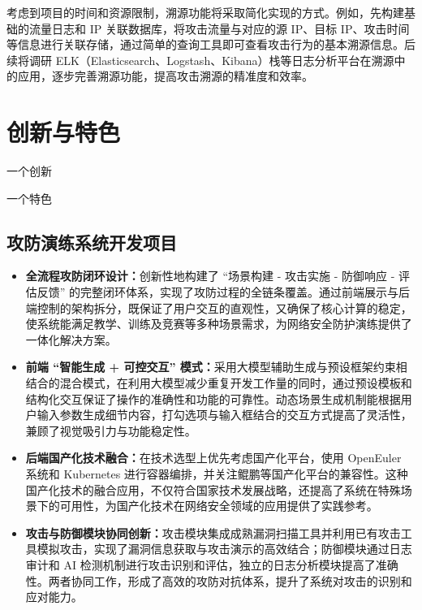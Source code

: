 \documentclass[lang=cn,10pt]{elegantbook}
\begin{document}
考虑到项目的时间和资源限制，溯源功能将采取简化实现的方式。例如，先构建基础的流量日志和 IP 关联数据库，将攻击流量与对应的源 IP、目标 IP、攻击时间等信息进行关联存储，通过简单的查询工具即可查看攻击行为的基本溯源信息。后续将调研 ELK（Elasticsearch、Logstash、Kibana）栈等日志分析平台在溯源中的应用，逐步完善溯源功能，提高攻击溯源的精准度和效率。

\chapter{创新与特色}
\begin{introduction}
  \item 一个创新
  \item 一个特色
\end{introduction}

\section{攻防演练系统开发项目}
\begin{itemize}
    \item \textbf{全流程攻防闭环设计：}创新性地构建了 “场景构建 - 攻击实施 - 防御响应 - 评估反馈” 的完整闭环体系，实现了攻防过程的全链条覆盖。通过前端展示与后端控制的架构拆分，既保证了用户交互的直观性，又确保了核心计算的稳定，使系统能满足教学、训练及竞赛等多种场景需求，为网络安全防护演练提供了一体化解决方案。
    \item \textbf{前端 “智能生成 + 可控交互” 模式：}采用大模型辅助生成与预设框架约束相结合的混合模式，在利用大模型减少重复开发工作量的同时，通过预设模板和结构化交互保证了操作的准确性和功能的可靠性。动态场景生成机制能根据用户输入参数生成细节内容，打勾选项与输入框结合的交互方式提高了灵活性，兼顾了视觉吸引力与功能稳定性。
    \item \textbf{后端国产化技术融合：}在技术选型上优先考虑国产化平台，使用 OpenEuler 系统和 Kubernetes 进行容器编排，并关注鲲鹏等国产化平台的兼容性。这种国产化技术的融合应用，不仅符合国家技术发展战略，还提高了系统在特殊场景下的可用性，为国产化技术在网络安全领域的应用提供了实践参考。
    \item \textbf{攻击与防御模块协同创新：}攻击模块集成成熟漏洞扫描工具并利用已有攻击工具模拟攻击，实现了漏洞信息获取与攻击演示的高效结合；防御模块通过日志审计和 AI 检测机制进行攻击识别和评估，独立的日志分析模块提高了准确性。两者协同工作，形成了高效的攻防对抗体系，提升了系统对攻击的识别和应对能力。
\end{itemize}
\end{document}
